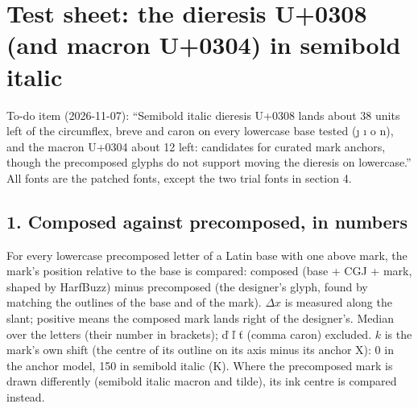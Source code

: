 \documentclass[10pt]{article}
\begin{document}
\section*{Test sheet: the dieresis U+0308 (and macron U+0304) in semibold italic}

To-do item (2026-11-07): ``Semibold italic dieresis U+0308 lands about 38 units left of the circumflex, breve and caron on every lowercase base tested (ȷ ı o n), and the macron U+0304 about 12 left: candidates for curated mark anchors, though the precomposed glyphs do not support moving the dieresis on lowercase.''
All fonts are the patched fonts, except the two trial fonts in section 4.

\subsection*{1. Composed against precomposed, in numbers}
For every lowercase precomposed letter of a Latin base with one above mark, the mark's position relative to the base is compared:
composed (base + CGJ + mark, shaped by HarfBuzz) minus precomposed (the designer's glyph, found by matching the outlines of the base and of the mark).
$\Delta x$ is measured along the slant; positive means the composed mark lands right of the designer's.
Median over the letters (their number in brackets); ď ľ ť (comma caron) excluded.
$k$ is the mark's own shift (the centre of its outline on its axis minus its anchor X): 0 in the anchor model, 150 in semibold italic (K).
Where the precomposed mark is drawn differently (semibold italic macron and tilde), its ink centre is compared instead.
\end{document}
